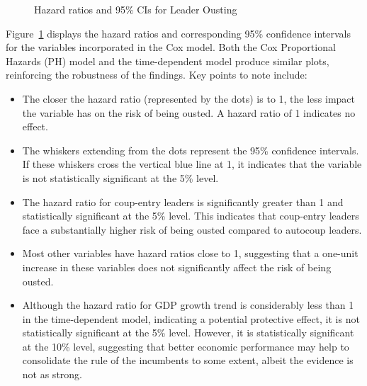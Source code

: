 \documentclass[
  12pt,
]{report}
\providecommand{\tightlist}{%
  \setlength{\itemsep}{0pt}\setlength{\parskip}{0pt}}\usepackage{longtable,booktabs,array}
\begin{document}
\begin{figure}
\begin{minipage}{0.50\linewidth}
{}


\end{minipage}%

\caption{\label{fig-coxHR}Hazard ratios and 95\% CIs for Leader Ousting}

\end{figure}%

Figure~\ref{fig-coxHR} displays the hazard ratios and corresponding 95\%
confidence intervals for the variables incorporated in the Cox model.
Both the Cox Proportional Hazards (PH) model and the time-dependent
model produce similar plots, reinforcing the robustness of the findings.
Key points to note include:

\begin{itemize}
\item
  The closer the hazard ratio (represented by the dots) is to 1, the
  less impact the variable has on the risk of being ousted. A hazard
  ratio of 1 indicates no effect.
\item
  The whiskers extending from the dots represent the 95\% confidence
  intervals. If these whiskers cross the vertical blue line at 1, it
  indicates that the variable is not statistically significant at the
  5\% level.
\end{itemize}

\begin{itemize}
\item
  The hazard ratio for coup-entry leaders is significantly greater than
  1 and statistically significant at the 5\% level. This indicates that
  coup-entry leaders face a substantially higher risk of being ousted
  compared to autocoup leaders.
\item
  Most other variables have hazard ratios close to 1, suggesting that a
  one-unit increase in these variables does not significantly affect the
  risk of being ousted.
\end{itemize}

\begin{itemize}
\tightlist
\item
  Although the hazard ratio for GDP growth trend is considerably less
  than 1 in the time-dependent model, indicating a potential protective
  effect, it is not statistically significant at the 5\% level. However,
  it is statistically significant at the 10\% level, suggesting that
  better economic performance may help to consolidate the rule of the
  incumbents to some extent, albeit the evidence is not as strong.
\end{itemize}
\end{document}
